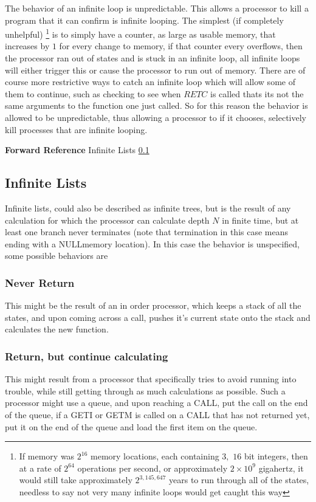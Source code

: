 \documentclass[12pt,letterpaper]{report}
\newcommand{\nil}{NULL}
\newcommand{\SEE}{\textbf{Forward Reference} }
\newcommand{\fref}[2]{#2 \ref{#1:#2}}
\begin{document}
The behavior of an infinite loop is unpredictable. This allows a processor to kill a program that it can confirm is infinite looping. The simplest (if completely unhelpful) \footnote{If memory was $2^{16}$ memory locations, each containing $3,$ $16$ bit integers, then at a rate of $2^{64}$ operations per second, or approximately $2 \times 10^9$ gigahertz, it would still take approximately $2^{3,145,647}$ years to run through all of the states, needless to say not very many infinite loops would get caught this way} is to simply have a counter, as large as usable memory, that increases by $1$ for every change to memory, if that counter every overflows, then the processor ran out of states and is stuck in an infinite loop, all infinite loops will either trigger this or cause the processor to run out of memory. There are of course more restrictive ways to catch an infinite loop which will allow some of them to continue, such as checking to see when $RETC$ is called thats its not the same arguments to the function one just called. So for this reason the behavior is allowed to be unpredictable, thus allowing a processor to if it chooses, selectively kill processes that are infinite looping.

\SEE \fref{label}{Infinite Lists}
\subsection{Infinite Lists}
\label{label:Infinite Lists}
Infinite lists, could also be described as infinite trees, but is the result of any calculation for which the processor can calculate depth $N$ in finite time, but at least one branch never terminates (note that termination in this case means ending with a \nil memory location). In this case the behavior is unspecified, some possible behaviors are
\subsubsection{Never Return}
This might be the result of an in order processor, which keeps a stack of all the states, and upon coming across a call, pushes it's current state onto the stack and calculates the new function.
\subsubsection{Return, but continue calculating}
This might result from a processor that specifically tries to avoid running into trouble, while still getting through as much calculations as possible. Such a processor might use a queue, and upon reaching a CALL, put the call on the end of the queue, if a GETI or GETM is called on a CALL that has not returned yet, put it on the end of the queue and load the first item on the queue.
\end{document}

